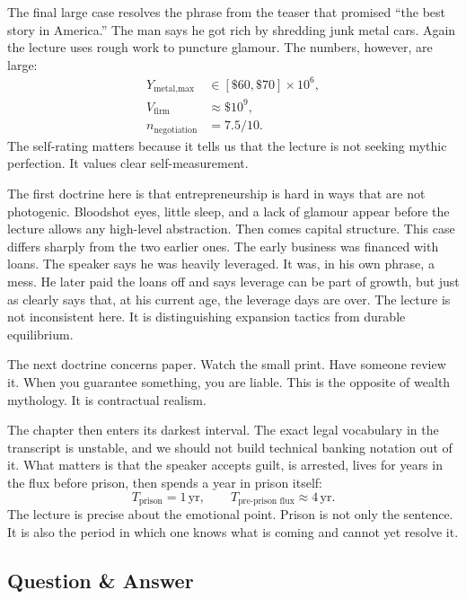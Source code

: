 The final large case resolves the phrase from the teaser that promised ``the best story in America.'' The man says he got rich by shredding junk metal cars. Again the lecture uses rough work to puncture glamour. The numbers, however, are large:
\begin{align}
Y_{\text{metal,max}}&\in[\$60,\$70]\times 10^6,\\
V_{\text{firm}}&\approx \$10^9,\\
n_{\text{negotiation}}&=7.5/10.
\end{align}
The self-rating matters because it tells us that the lecture is not seeking mythic perfection. It values clear self-measurement.

The first doctrine here is that entrepreneurship is hard in ways that are not photogenic. Bloodshot eyes, little sleep, and a lack of glamour appear before the lecture allows any high-level abstraction. Then comes capital structure. This case differs sharply from the two earlier ones. The early business was financed with loans. The speaker says he was heavily leveraged. It was, in his own phrase, a mess. He later paid the loans off and says leverage can be part of growth, but just as clearly says that, at his current age, the leverage days are over. The lecture is not inconsistent here. It is distinguishing expansion tactics from durable equilibrium.

The next doctrine concerns paper. Watch the small print. Have someone review it. When you guarantee something, you are liable. This is the opposite of wealth mythology. It is contractual realism.

The chapter then enters its darkest interval. The exact legal vocabulary in the transcript is unstable, and we should not build technical banking notation out of it. What matters is that the speaker accepts guilt, is arrested, lives for years in the flux before prison, then spends a year in prison itself:
\begin{equation}
T_{\text{prison}}=1\,\mathrm{yr},\qquad
T_{\text{pre-prison flux}}\approx 4\,\mathrm{yr}.
\end{equation}
The lecture is precise about the emotional point. Prison is not only the sentence. It is also the period in which one knows what is coming and cannot yet resolve it.

\subsection{Question \& Answer}

